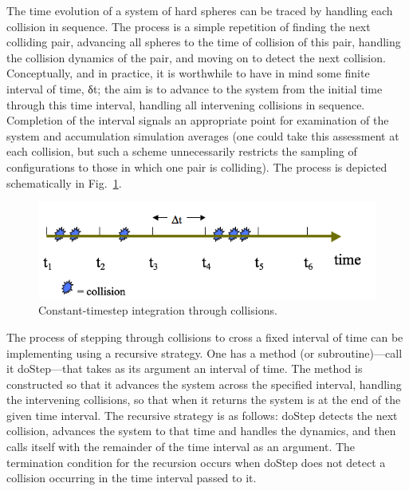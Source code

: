 \documentclass[]{article}
\begin{document}
The time evolution of a system of hard spheres can be traced by handling
each collision in sequence. The process is a simple repetition of
finding the next colliding pair, advancing all spheres to the time of
collision of this pair, handling the collision dynamics of the pair, and
moving on to detect the next collision. Conceptually, and in practice,
it is worthwhile to have in mind some finite interval of time, δt; the
aim is to advance to the system from the initial time through this time
interval, handling all intervening collisions in sequence. Completion of
the interval signals an appropriate point for examination of the system
and accumulation simulation averages (one could take this assessment at
each collision, but such a scheme unnecessarily restricts the sampling
of configurations to those in which one pair is colliding). The process
is depicted schematically in Fig.~\ref{fig:integration}.

\begin{figure}
  \centering
  \includegraphics[width=\textwidth]{HSMD_figures/image037}
  \caption{\label{fig:integration}Constant-timestep integration through collisions.}
\end{figure}

The process of stepping through collisions to cross a fixed interval of
time can be implementing using a recursive strategy. One has a method
(or subroutine)---call it doStep---that takes as its argument an
interval of time. The method is constructed so that it advances the
system across the specified interval, handling the intervening
collisions, so that when it returns the system is at the end of the
given time interval. The recursive strategy is as follows: doStep
detects the next collision, advances the system to that time and handles
the dynamics, and then calls itself with the remainder of the time
interval as an argument. The termination condition for the recursion
occurs when doStep does not detect a collision occurring in the time
interval passed to it.

\end{document}
